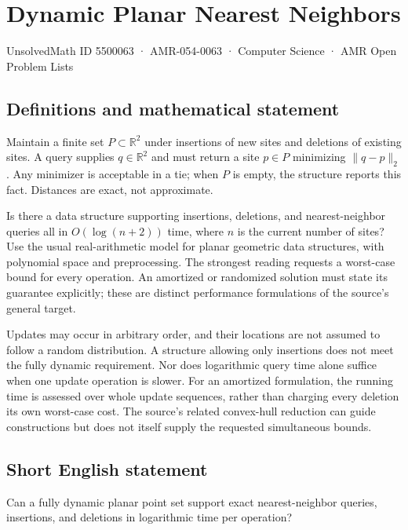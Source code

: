 \documentclass[11pt,a4paper]{article}
\begin{document}
\section*{Dynamic Planar Nearest Neighbors}\label{5500063}
{\small UnsolvedMath ID 5500063 · AMR-054-0063 · Computer Science · AMR Open Problem Lists}
\subsection{Definitions and mathematical statement}
Maintain a finite set $P\subset\mathbb R^2$ under insertions of
new sites and deletions of existing sites. A query supplies
$q\in\mathbb R^2$ and must return a site $p\in P$ minimizing
$\|q-p\|_2$. Any minimizer is acceptable in a tie; when $P$ is
empty, the structure reports this fact. Distances are exact,
not approximate.

Is there a data structure supporting insertions, deletions,
and nearest-neighbor queries all in $O(\log(n+2))$ time, where
$n$ is the current number of sites? Use the usual real-arithmetic
model for planar geometric data structures, with polynomial
space and preprocessing. The strongest reading requests a
worst-case bound for every operation. An amortized or randomized
solution must state its guarantee explicitly; these are distinct
performance formulations of the source's general target.

Updates may occur in arbitrary order, and their locations are
not assumed to follow a random distribution. A structure allowing
only insertions does not meet the fully dynamic requirement.
Nor does logarithmic query time alone suffice when one update
operation is slower. For an amortized formulation, the running
time is assessed over whole update sequences, rather than
charging every deletion its own worst-case cost. The source's
related convex-hull reduction can guide constructions but does
not itself supply the requested simultaneous bounds.
\subsection{Short English statement}
Can a fully dynamic planar point set support exact nearest-neighbor queries, insertions, and deletions in logarithmic time per operation?
\end{document}
